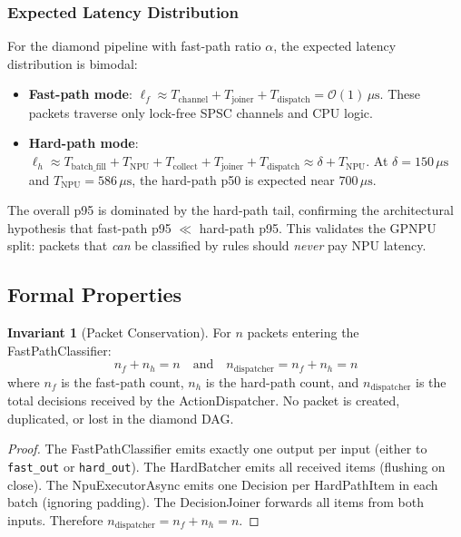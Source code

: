 \documentclass[11pt,a4paper,twoside]{article}
\theoremstyle{definition}
\newtheorem{invariant}{Invariant}[section]
\theoremstyle{remark}
\newcommand{\BigO}{\mathcal{O}}
\begin{document}
\subsubsection{Expected Latency Distribution}

For the diamond pipeline with fast-path ratio $\alpha$, the expected latency distribution is bimodal:
\begin{itemize}[leftmargin=*]
  \item \textbf{Fast-path mode}: $\ell_f \approx T_{\text{channel}} + T_{\text{joiner}} + T_{\text{dispatch}} = \BigO(1)\,\mu\text{s}$. These packets traverse only lock-free SPSC channels and CPU logic.
  \item \textbf{Hard-path mode}: $\ell_h \approx T_{\text{batch\_fill}} + T_{\text{NPU}} + T_{\text{collect}} + T_{\text{joiner}} + T_{\text{dispatch}} \approx \delta + T_{\text{NPU}}$. At $\delta = 150\,\mu\text{s}$ and $T_{\text{NPU}} = 586\,\mu\text{s}$, the hard-path p50 is expected near $700\,\mu\text{s}$.
\end{itemize}

\noindent The overall p95 is dominated by the hard-path tail, confirming the architectural hypothesis that fast-path p95 $\ll$ hard-path p95. This validates the GPNPU split: packets that \emph{can} be classified by rules should \emph{never} pay NPU latency.

\subsection{Formal Properties}

\begin{invariant}[Packet Conservation]
\label{inv:gpnpu-conservation}
For $n$ packets entering the FastPathClassifier:
\begin{equation}
n_f + n_h = n \quad \text{and} \quad n_{\text{dispatcher}} = n_f + n_h = n
\end{equation}
where $n_f$ is the fast-path count, $n_h$ is the hard-path count, and $n_{\text{dispatcher}}$ is the total decisions received by the ActionDispatcher. No packet is created, duplicated, or lost in the diamond DAG.
\end{invariant}

\begin{proof}
The FastPathClassifier emits exactly one output per input (either to \texttt{fast\_out} or \texttt{hard\_out}). The HardBatcher emits all received items (flushing on close). The NpuExecutorAsync emits one Decision per HardPathItem in each batch (ignoring padding). The DecisionJoiner forwards all items from both inputs. Therefore $n_{\text{dispatcher}} = n_f + n_h = n$.
\end{proof}
\end{document}
